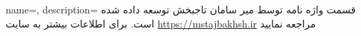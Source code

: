 {
  name={},
  description={
  	قسمت واژه نامه توسط میر سامان تاجبخش توسعه داده شده است. برای اطلاعات بیشتر به سایت
  	\url{https://mstajbakhsh.ir}
  	مراجعه نمایید
  }
}